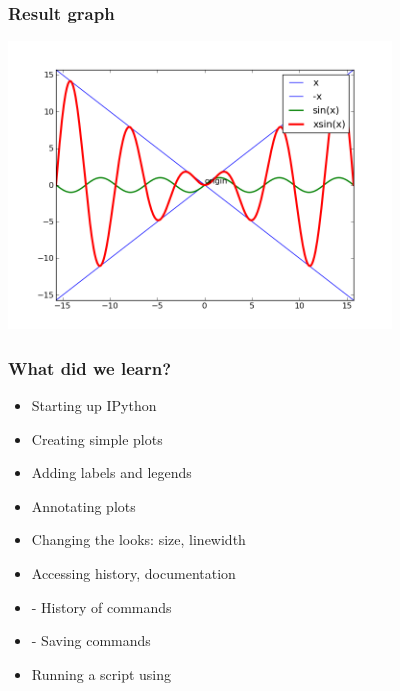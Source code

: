 \documentclass[14pt,compress]{beamer}
\newcommand{\kwrd}[1]{ \texttt{\textbf{\color{blue}{#1}}}  }
\begin{document}
\begin{frame}[fragile]
  \frametitle{Result graph}
  \begin{center}
    \includegraphics[height=3in, interpolate=true]{data/four_plot}
  \end{center}
\end{frame}

\begin{frame}[fragile]
  \frametitle{What did we learn?}
  \begin{itemize}
    \item Starting up IPython
    \item Creating simple plots
    \item Adding labels and legends
    \item Annotating plots
    \item Changing the looks: size, linewidth
    \item Accessing history, documentation
    \item \kwrd{\%hist} - History of commands
    \item \kwrd{\%save} - Saving commands 
    \item Running a script using \kwrd{\%run -i}
  \end{itemize}
\end{frame}
\end{document}
